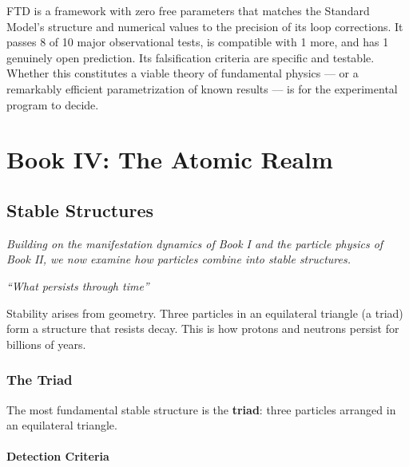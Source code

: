 \documentclass[
  11pt,
  letterpaper,
  twoside,
  openright]{book}
\begin{document}
FTD is a framework with zero free parameters that matches the Standard
Model's structure and numerical values to the precision of its loop
corrections. It passes 8 of 10 major observational tests, is compatible
with 1 more, and has 1 genuinely open prediction. Its falsification
criteria are specific and testable. Whether this constitutes a viable
theory of fundamental physics --- or a remarkably efficient
parametrization of known results --- is for the experimental program to
decide.

\part{Book IV: The Atomic Realm}

\chapter{Stable Structures}\label{sec-stable-structures}

\emph{Building on the manifestation dynamics of Book I and the particle
physics of Book II, we now examine how particles combine into stable
structures.}

\emph{``What persists through time''}

\begin{tcolorbox}[enhanced jigsaw, coltitle=black, colbacktitle=quarto-callout-note-color!10!white, toprule=.15mm, colframe=quarto-callout-note-color-frame, arc=.35mm, opacityback=0, bottomtitle=1mm, toptitle=1mm, breakable, colback=white, titlerule=0mm, opacitybacktitle=0.6, title=\textcolor{quarto-callout-note-color}{\faInfo}\hspace{0.5em}{Key Revelation}, rightrule=.15mm, bottomrule=.15mm, leftrule=.75mm, left=2mm]

Stability arises from geometry. Three particles in an equilateral
triangle (a triad) form a structure that resists decay. This is how
protons and neutrons persist for billions of years.

\end{tcolorbox}

\section{The Triad}\label{the-triad}

The most fundamental stable structure is the \textbf{triad}: three
particles arranged in an equilateral triangle.

\subsection{Detection Criteria}\label{detection-criteria}
\end{document}
